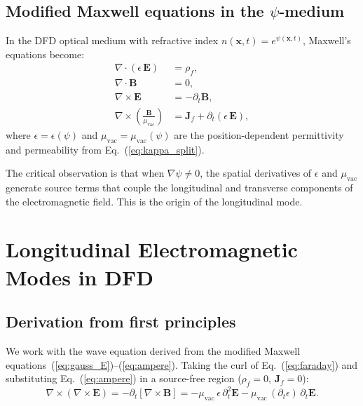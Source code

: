 \documentclass[aps,prd,twocolumn,superscriptaddress,nofootinbib,floatfix]{revtex4-2}
\newcommand{\psifield}{\psi}
\newcommand{\xvec}{\mathbf{x}}
\newcommand{\Evec}{\mathbf{E}}
\newcommand{\Bvec}{\mathbf{B}}
\newcommand{\Jvec}{\mathbf{J}}
\begin{document}
\subsection{Modified Maxwell equations in the $\psifield$-medium}
\label{subsec:maxwell_mod}

In the DFD optical medium with refractive index
$n(\xvec,t) = e^{\psifield(\xvec,t)}$, Maxwell's equations become:
\begin{align}
\nabla\cdot(\epsilon\,\Evec) &= \rho_f,
\label{eq:gauss_E}\\
\nabla\cdot\Bvec &= 0,
\label{eq:gauss_B}\\
\nabla\times\Evec &= -\partial_t\Bvec,
\label{eq:faraday}\\
\nabla\times\!\left(\frac{\Bvec}{\mu_{\text{vac}}}\right)
&= \Jvec_f + \partial_t(\epsilon\,\Evec),
\label{eq:ampere}
\end{align}
where $\epsilon = \epsilon(\psifield)$ and
$\mu_{\text{vac}} = \mu_{\text{vac}}(\psifield)$ are the
position-dependent permittivity and permeability from
Eq.~(\ref{eq:kappa_split}).

The critical observation is that when $\nabla\psifield \neq 0$,
the spatial derivatives of $\epsilon$ and $\mu_{\text{vac}}$
generate source terms that couple the longitudinal and transverse
components of the electromagnetic field. This is the origin of the
longitudinal mode.

\section{Longitudinal Electromagnetic Modes in DFD}
\label{sec:longitudinal}

\subsection{Derivation from first principles}

We work with the wave equation derived from the modified Maxwell
equations~(\ref{eq:gauss_E})--(\ref{eq:ampere}).
Taking the curl of Eq.~(\ref{eq:faraday}) and substituting
Eq.~(\ref{eq:ampere}) in a source-free region ($\rho_f = 0$,
$\Jvec_f = 0$):
\begin{equation}
\nabla\times(\nabla\times\Evec) =
-\partial_t\!\left[\nabla\times\Bvec\right]
= -\mu_{\text{vac}}\,\epsilon\,\partial_t^2\Evec
- \mu_{\text{vac}}\,(\partial_t\epsilon)\,\partial_t\Evec.
\label{eq:wave_step1}
\end{equation}
\end{document}
